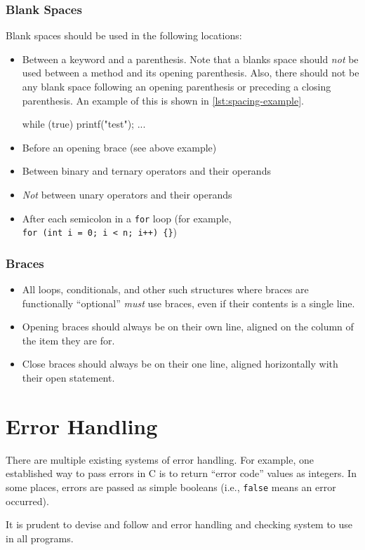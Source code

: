\documentclass[11pt]{article}
\begin{document}
\subsubsection{Blank Spaces}\label{blank-spaces}

Blank spaces should be used in the following locations:

\begin{itemize}
\item
  Between a keyword and a parenthesis. Note that a blanks space should
  \emph{not} be used between a method and its opening parenthesis. Also,
  there should not be any blank space following an opening parenthesis
  or preceding a closing parenthesis. An example of this is shown in
  \autoref{lst:spacing-example}.

\begin{code}[caption=Spacing example, label=lst:spacing-example]
while (true) {
	printf("test");
	...
}
\end{code}

\item
  Before an opening brace (see above example)
\item
  Between binary and ternary operators and their operands
\item
  \emph{Not} between unary operators and their operands
\item
  After each semicolon in a \texttt{for} loop (for example,
  \texttt{for\ (int\ i\ =\ 0;\ i\ \textless{}\ n;\ i++)\ \{\}})
\end{itemize}

\subsubsection{Braces}\label{braces}

\begin{itemize}
\item
  All loops, conditionals, and other such structures where braces are
  functionally ``optional'' \emph{must} use braces, even if their
  contents is a single line.
\item
  Opening braces should always be on their own line, aligned on the
  column of the item they are for.
\item
  Close braces should always be on their one line, aligned horizontally
  with their open statement.
\end{itemize}

\section{Error Handling}\label{error-handling}

There are multiple existing systems of error handling. For example, one
established way to pass errors in C is to return ``error code'' values
as integers. In some places, errors are passed as simple booleans (i.e.,
\texttt{false} means an error occurred).

It is prudent to devise and follow and error handling and checking
system to use in all programs.
\end{document}
